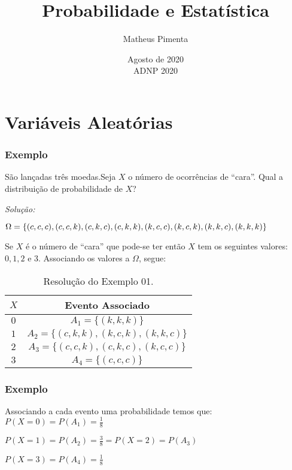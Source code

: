\documentclass[hyperref={pdfpagelabels=false}]{beamer}
\title{Probabilidade e Estatística}
\author[Matheus Pimenta]{Matheus Pimenta}
\institute[UTFPR-CP]{\normalsize Universidade Tecnológica Federal do Paraná \\
	Câmpus Cornélio Procópio
}
\date{Agosto de 2020 \\ ADNP 2020}
\begin{document}
	
\begin{frame}
\titlepage
\end{frame} 




\section{Variáveis Aleatórias} 

\begin{frame}
\frametitle{Exemplo}

São lançadas três moedas.Seja $X$ o número de ocorrências de ``cara''. Qual a distribuição de probabilidade de $X$?

\pause
{\it Solução:}

$\footnotesize{ \Omega = \{ (c,c,c), (c,c,k), (c,k,c), (c,k,k), (k,c,c), (k,c,k), (k,k,c), (k,k,k) \}}$

\pause

Se $X$ é o número de ``cara'' que pode-se ter então $X$ tem os seguintes valores: $0,1,2$ e $3$. Associando os valores a $\Omega$, segue:

\begin{table}[!h]
	\centering
	\begin{tabular}{|c|c|}
		\hline
		$X$		&	Evento Associado \\ \hline \pause
		$0$		&	$A_1 = \{(k,k,k)\}$	\\ \hline \pause
		$1$		&	$A_2 = \{(c,k,k),(k,c,k),(k,k,c)\}$	\\ \hline \pause
		$2$		&	$A_3 = \{(c,c,k),(c,k,c),(k,c,c)\}$	\\ \hline \pause
		$3$		&	$A_4 = \{(c,c,c)\}$	\\ \hline
	\end{tabular}
	\caption{Resolução do Exemplo 01.}
\end{table}
\pause

\end{frame}

\begin{frame}
\frametitle{Exemplo}
Associando a cada evento uma probabilidade temos que:
$P(X=0)=P(A_1) = \displaystyle \frac{1}{8}$
\vspace{4pt}

\pause
$P(X=1)=P(A_2) = \displaystyle \frac{3}{8} = P(X=2)=P(A_3)$
\vspace{4pt}

\pause
$P(X=3)=P(A_4) = \displaystyle \frac{1}{8}$

\end{frame}
\end{document}
